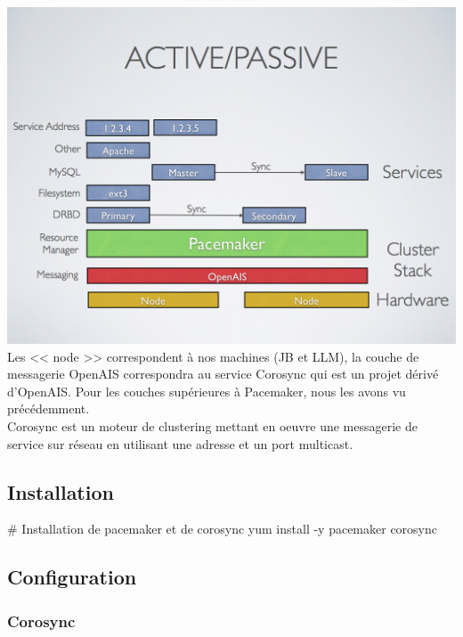 \documentclass[11pt,a4paper]{report}
\begin{document}
                \includegraphics[keepaspectratio=true, width=\textwidth]{content/pacemaker-active-passive.png}\\[1cm]
                
                Les << node >> correspondent à nos machines (JB et LLM), la couche de messagerie OpenAIS correspondra au service Corosync qui est un projet dérivé d'OpenAIS. Pour les couches supérieures à Pacemaker, nous les avons vu précédemment.\\
                
                Corosync est un moteur de clustering mettant en oeuvre une messagerie de service sur réseau en utilisant une adresse et un port multicast.
            
            \subsection{Installation}
            
                \begin{bashcode}
                    # Installation de pacemaker et de corosync
                    yum install -y pacemaker corosync
                \end{bashcode}
            
            \subsection{Configuration}
                
                \subsubsection{Corosync}
                
\end{document}
